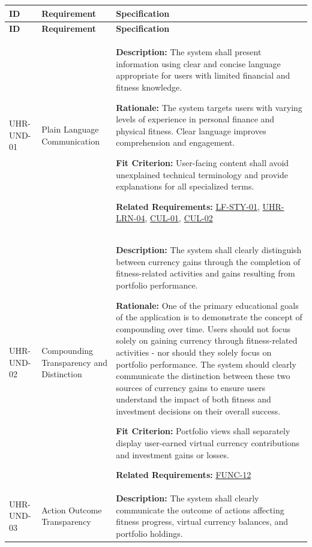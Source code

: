 \documentclass[12pt]{article}
\begin{document}
\small
\setlength{\tabcolsep}{4pt}
\begin{xltabular}{\textwidth}{|p{2.6cm}|p{3.4cm}|X|}
\hline
\textbf{ID} & \textbf{Requirement} & \textbf{Specification} \\
\hline
\endfirsthead
\hline
\textbf{ID} & \textbf{Requirement} & \textbf{Specification} \\
\hline
\endhead

UHR-UND-01\hypertarget{req:UHR-UND-01}{} &
Plain Language Communication &
\textbf{Description:} The system shall present information using clear and concise language appropriate for users with limited financial and fitness knowledge.

\textbf{Rationale:} The system targets users with varying levels of experience in personal finance and physical fitness. Clear language improves comprehension and engagement.

\textbf{Fit Criterion:} User-facing content shall avoid unexplained technical terminology and provide explanations for all specialized terms.

\textbf{Related Requirements:} \hyperlink{req:LF-STY-01}{LF-STY-01}, \hyperlink{req:UHR-LRN-04}{UHR-LRN-04}, \hyperlink{req:CUL-01}{CUL-01}, \hyperlink{req:CUL-02}{CUL-02}\\
\hline

UHR-UND-02\hypertarget{req:UHR-UND-02}{} &
Compounding Transparency and Distinction &
\textbf{Description:} The system shall clearly distinguish between currency gains through the completion of fitness-related activities and gains resulting from portfolio performance.

\textbf{Rationale:} One of the primary educational goals of the application is to demonstrate the concept of compounding over time. Users should not focus solely on gaining currency through fitness-related activities - nor should they solely focus on portfolio performance. The system should clearly communicate the distinction between these two sources of currency gains to ensure users understand the impact of both fitness and investment decisions on their overall success.

\textbf{Fit Criterion:} Portfolio views shall separately display user-earned virtual currency contributions and investment gains or losses.

\textbf{Related Requirements:} \hyperlink{req:FUNC-12}{FUNC-12}\\
\hline

UHR-UND-03\hypertarget{req:UHR-UND-03}{} &
Action Outcome Transparency &
\textbf{Description:} The system shall clearly communicate the outcome of actions affecting fitness progress, virtual currency balances, and portfolio holdings.


\end{xltabular}
\end{document}
